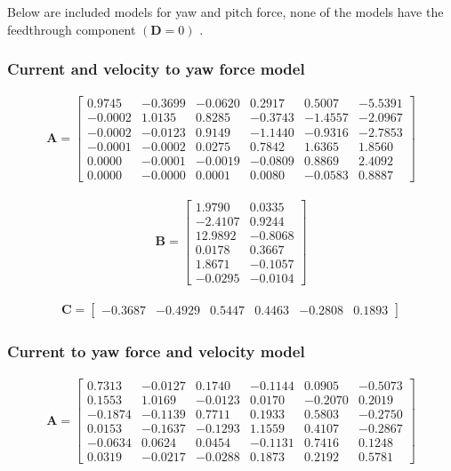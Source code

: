 Below are included models for yaw and pitch force, none of the models have the feedthrough component  $\left( \mathbf{D} = 0 \right)$ .
\subsubsection{Current and velocity to yaw force model}

\begin{align}
\mathbf{A} = \begin{bmatrix}
    0.9745 &  -0.3699 & -0.0620 &   0.2917 &   0.5007 &  -5.5391 \\
   -0.0002 &   1.0135 &  0.8285 &  -0.3743 &  -1.4557 &  -2.0967 \\
   -0.0002 &  -0.0123 &  0.9149 &  -1.1440 &  -0.9316 &  -2.7853 \\
   -0.0001 &  -0.0002 &  0.0275 &   0.7842 &   1.6365 &   1.8560 \\
    0.0000 &  -0.0001 & -0.0019 &  -0.0809 &   0.8869 &   2.4092 \\
    0.0000 &  -0.0000 &  0.0001 &   0.0080 &  -0.0583 &   0.8887 
     \end{bmatrix}
\end{align}

\begin{align}
\mathbf{B} = \begin{bmatrix}
    1.9790  &   0.0335\\
   -2.4107  &   0.9244\\
   12.9892 &   -0.8068\\
    0.0178  &  0.3667\\
    1.8671  &  -0.1057\\
   -0.0295  &  -0.0104
     \end{bmatrix}
\end{align}

\begin{align}
\mathbf{C} = \begin{bmatrix}
   -0.3687  & -0.4929    &0.5447   & 0.4463   &-0.2808    &0.1893
     \end{bmatrix}
\end{align}

\subsubsection{Current to yaw force and velocity model}
\begin{align}
\mathbf{A} = \begin{bmatrix}
    0.7313   &-0.0127    &0.1740   &-0.1144    &0.0905   &-0.5073\\
    0.1553    &1.0169   &-0.0123    &0.0170   &-0.2070    &0.2019\\
   -0.1874   &-0.1139   &0.7711    &0.1933    &0.5803   &-0.2750\\
    0.0153   &-0.1637   &-0.1293    &1.1559    &0.4107   &-0.2867\\
   -0.0634    &0.0624    &0.0454   &-0.1131    &0.7416    &0.1248\\
    0.0319   &-0.0217   &-0.0288    &0.1873    &0.2192    &0.5781
     \end{bmatrix}
\end{align}

